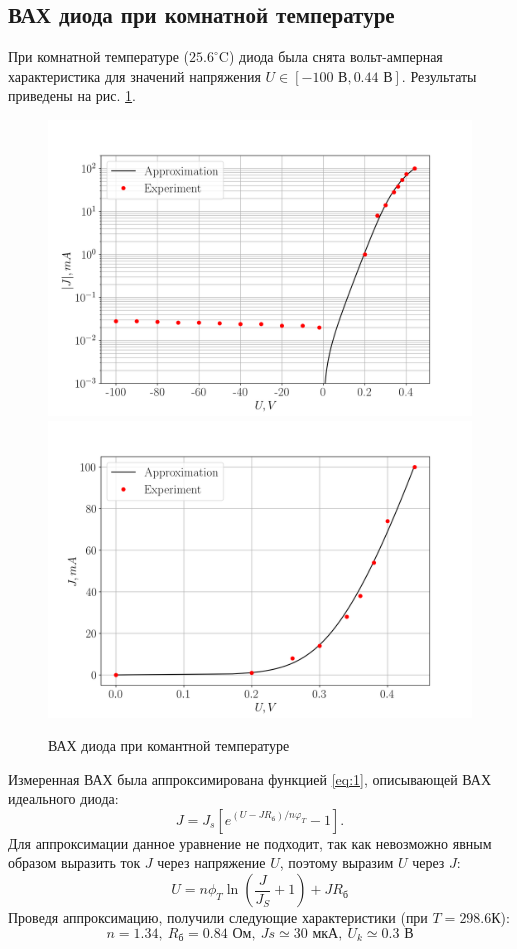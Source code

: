 \subsection{ВАХ диода при комнатной температуре}
При комнатной температуре ($25.6^{\circ}$C) диода была снята вольт-амперная характеристика для значений напряжения $U \in
[-100\text{ В},0.44\text{ В}]$. Результаты приведены на рис. \ref{fig:vah}.
\begin{figure}[h!]
    \centering
	\includegraphics[width = 0.49\linewidth]{imgs/vah1log.png}
    \includegraphics[width = 0.49\linewidth]{imgs/vah1str.png}	
    \caption{ВАХ диода при комантной температуре}
    \label{fig:vah}
\end{figure}
Измеренная ВАХ была аппроксимирована функцией \eqref{eq:1}, описывающей ВАХ идеального диода:
\begin{equation}
    J=J_s[e^{(U-JR_{\text{б}})/n \varphi_T}-1].
    \label{eq:id}
\end{equation}
Для аппроксимации данное уравнение не подходит, так как невозможно явным образом выразить ток $J$ через напряжение
$U$, поэтому выразим $U$ через $J$: 
\begin{equation}
    U = n\phi_T \ln{(\frac{J}{J_S}+1 )}+J R_{\text{б}}
    \label{eq:id2}
\end{equation}
Проведя аппроксимацию, получили следующие характеристики (при $T=298.6$К):
\begin{equation}
    n = 1.34,~ R_{\text{б}} = 0.84 \text{ Ом},~Js \simeq 30 \text{ мкА},~ U_k \simeq 0.3 \text{ В}
\end{equation}
